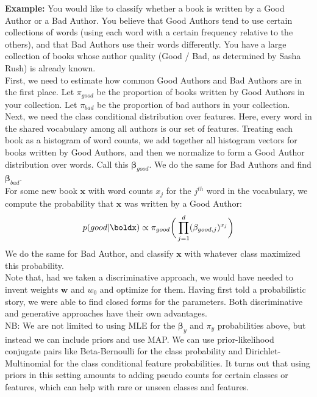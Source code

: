 \documentclass[12pt,letterpaper]{article}
\newcommand{\1}{\mathbbm{1}}
\begin{document}
\textbf{Example:} You would like to classify whether a book is written by a Good Author or a Bad Author. You believe that Good Authors tend to use certain collections of words (using each word with a certain frequency relative to the others), and that Bad Authors use their words differently. You have a large collection of books whose author quality (Good / Bad, as determined by Sasha Rush) is already known.\\

\noindent
First, we need to estimate how common Good Authors and Bad Authors are in the first place. Let $\pi_{good}$ be the proportion of books written by Good Authors in your collection. Let $\pi_{bad}$ be the proportion of bad authors in your collection.\\

\noindent 
Next, we need the class conditional distribution over features. Here, every word in the shared vocabulary among all authors is our set of features. Treating each book as a histogram of word counts, we add together all histogram vectors for books written by Good Authors, and then we normalize to form a Good Author distribution over words. Call this $\boldsymbol{\beta}_{good}$. We do the same for Bad Authors and find $\boldsymbol{\beta}_{bad}$.\\

\noindent
For some new book $\mathbf{x}$ with word counts $x_j$ for the $j^{th}$ word in the vocabulary, we compute the probability that $\mathbf{x}$ was written by a Good Author:
\begin{align}
p(good | \boldx) \propto \pi_{good} \bigg(\prod_{j=1}^d (\beta_{good, j})^{x_j}\bigg)
\end{align}
We do the same for Bad Author, and classify $\mathbf{x}$ with whatever class maximized this probability. \\

\noindent
Note that, had we taken a discriminative approach, we would have needed to invent weights $\mathbf{w}$ and $w_0$ and optimize for them. Having first told a probabilistic story, we were able to find closed forms for the parameters. Both discriminative and generative approaches have their own advantages.\\

\noindent
NB: We are not limited to using MLE for the $\boldsymbol{\beta}_y$ and $\pi_y$ probabilities above, but instead we can include priors and use MAP. We can use prior-likelihood conjugate pairs like Beta-Bernoulli for the class probability and Dirichlet-Multinomial for the class conditional feature probabilities. It turns out that using priors in this setting amounts to adding pseudo counts for certain classes or features, which can help with rare or unseen classes and features.
\end{document}
